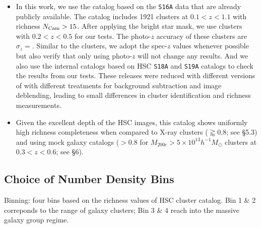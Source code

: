 \documentclass[fleqn,usenatbib,useAMS,english]{mnras}
\begin{document}
\begin{itemize}
        \item In this work, we use the \camira{} catalog based on the \texttt{S16A} data
            that are already publicly available.
            The catalog includes 1921 clusters at $0.1 < z < 1.1$ with richness $N_{\rm Cam} > 15$.
            After applying the bright star mask, we use  clusters with
            $0.2 < z < 0.5$ for our tests.
            The photo-$z$ accuracy of these clusters are $\sigma_{z}=$.
            Similar to the \redm{} clusters, we adopt the spec-$z$ values whenever possible
            but also verify that only using photo-$z$ will not change any results.
            And we also use the internal \camira{} catalogs based on HSC \texttt{S18A} and
            \texttt{S19A} catalogs to check the results from our tests.
            These releases were reduced with different versions of \hscpipe{} with
            different treatments for background subtraction and image deblending,
            leading to small differences in cluster identification and richness
            measurements.

        \item {}
            Given the excellent depth of the HSC images, this \camira{} catalog shows
            uniformly high richness completeness when compared to X-ray clusters
            ($\gtrapprox 0.8$; see \citealt{Oguri2018} \S 5.3) and using mock galaxy catalogs 
            ($> 0.8$ for $M_{200c} > 5 \times 10^{13} h^{-1} M_{\odot}$ clusters at 
            $0.3 < z < 0.6$; see \citealt{Oguri2018} \S 6).

    \end{itemize}

\subsection{Choice of Number Density Bins}
    \label{sec:binning}


    Binning: four bins based on the richness values of HSC \redm{} cluster catalog. Bin 1 \& 2
    correponds to the \mvir{} range of galaxy clusters; Bin 3 \& 4 reach into the massive galaxy
    group regime.
\end{document}
